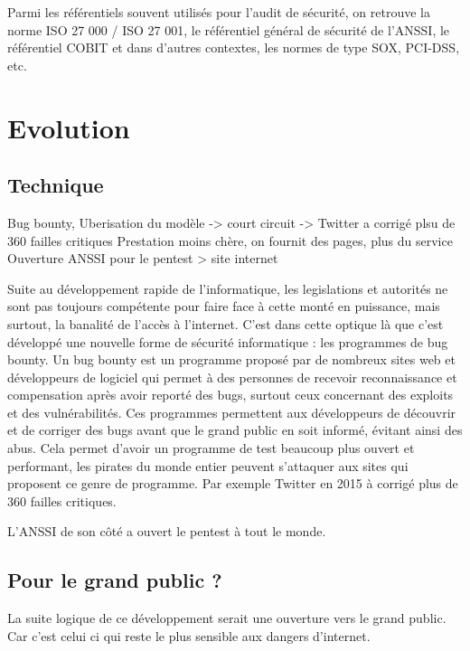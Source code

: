 \documentclass[a4paper]{memoir}
\begin{document}
Parmi les référentiels souvent utilisés pour l’audit de sécurité, on retrouve la norme ISO 27 000 / ISO 27 001, le référentiel général de sécurité de l’ANSSI, le référentiel COBIT et dans d’autres contextes, les normes de type SOX, PCI-DSS, etc.\\

\part{Evolution}

\chapter{Technique}

Bug bounty, Uberisation du modèle -> court circuit -> Twitter a corrigé plsu de 360 failles critiques 
Prestation moins chère, on fournit des pages, plus du service
Ouverture ANSSI pour le pentest > site internet 

Suite au développement rapide de l'informatique, les legislations et autorités ne sont pas toujours compétente pour faire face à cette monté en puissance, mais surtout, la banalité de l'accès à l'internet.
C'est dans cette optique là que c'est développé une nouvelle forme de sécurité informatique : les programmes de bug bounty.
Un bug bounty est un programme proposé par de nombreux sites web et développeurs de logiciel qui permet à des personnes de recevoir reconnaissance et compensation après avoir reporté des bugs, surtout ceux concernant des exploits et des vulnérabilités. Ces programmes permettent aux développeurs de découvrir et de corriger des bugs avant que le grand public en soit informé, évitant ainsi des abus. 
Cela permet d'avoir un programme de test beaucoup plus ouvert et performant, les pirates du monde entier peuvent s'attaquer aux sites qui proposent ce genre de programme. Par exemple Twitter en 2015 à corrigé plus de 360 failles critiques.

L'ANSSI de son côté a ouvert le pentest à tout le monde.



\chapter{Pour le grand public ?}

La suite logique de ce développement serait une ouverture vers le grand public. Car c'est celui ci qui reste le plus sensible aux dangers d'internet.
\end{document}
